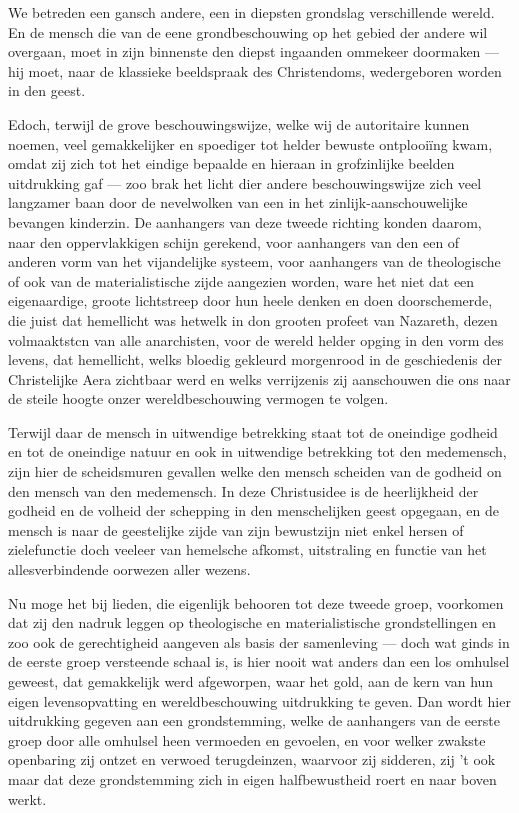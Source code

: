 \documentclass[a4paper, 12pt, oneside, dutch]{article}
\begin{document}
We betreden een gansch andere, een in diepsten grondslag verschillende wereld. En de mensch die van de eene grondbeschouwing op het gebied der andere wil overgaan, moet in zijn binnenste den diepst ingaanden ommekeer doormaken --- hij moet, naar de klassieke beeldspraak des Christendoms, wedergeboren worden in den geest.

Edoch, terwijl de grove beschouwingswijze, welke wij de autoritaire kunnen noemen, veel gemakkelijker en spoediger tot helder bewuste ontplooiïng kwam, omdat zij zich tot het eindige bepaalde en hieraan in grofzinlijke beelden uitdrukking gaf --- zoo brak het licht dier andere beschouwingswijze zich veel langzamer baan door de nevelwolken van een in het zinlijk-aanschouwelijke bevangen kinderzin. De aanhangers van deze tweede richting konden daarom, naar den oppervlakkigen schijn gerekend, voor aanhangers van den een of anderen vorm van het vijandelijke systeem, voor aanhangers van de theologische of ook van de materialistische zijde aangezien worden, ware het niet dat een eigenaardige, groote lichtstreep door hun heele denken en doen doorschemerde, die juist dat hemellicht was hetwelk in don grooten profeet van Nazareth, dezen volmaaktstcn van alle anarchisten, voor de wereld helder opging in den vorm des levens, dat hemellicht, welks bloedig gekleurd morgenrood in de geschiedenis der Christelijke Aera zichtbaar werd en welks verrijzenis zij aanschouwen die ons naar de steile hoogte onzer wereldbeschouwing vermogen te volgen.

Terwijl daar de mensch in uitwendige betrekking staat tot de oneindige godheid en tot de oneindige natuur en ook in uitwendige betrekking tot den medemensch, zijn hier de scheidsmuren gevallen welke den mensch scheiden van de godheid on den mensch van den medemensch. In deze Christusidee is de heerlijkheid der godheid en de volheid der schepping in den menschelijken geest opgegaan, en de mensch is naar de geestelijke zijde van zijn bewustzijn niet enkel hersen of zielefunctie doch veeleer van hemelsche afkomst, uitstraling en functie van het allesverbindende oorwezen aller wezens.

Nu moge het bij lieden, die eigenlijk behooren tot deze tweede groep, voorkomen dat zij den nadruk leggen op theologische en materialistische grondstellingen en zoo ook de gerechtigheid aangeven als basis der samenleving --- doch wat ginds in de eerste groep versteende schaal is, is hier nooit wat anders dan een los omhulsel geweest, dat gemakkelijk werd afgeworpen, waar het gold, aan de kern van hun eigen levensopvatting en wereldbeschouwing uitdrukking te geven. Dan wordt hier uitdrukking gegeven aan een grondstemming, welke de aanhangers van de eerste groep door alle omhulsel heen vermoeden en gevoelen, en voor welker zwakste openbaring zij ontzet en verwoed terugdeinzen, waarvoor zij sidderen, zij 't ook maar dat deze grondstemming zich in eigen halfbewustheid roert en naar boven werkt.
\end{document}

